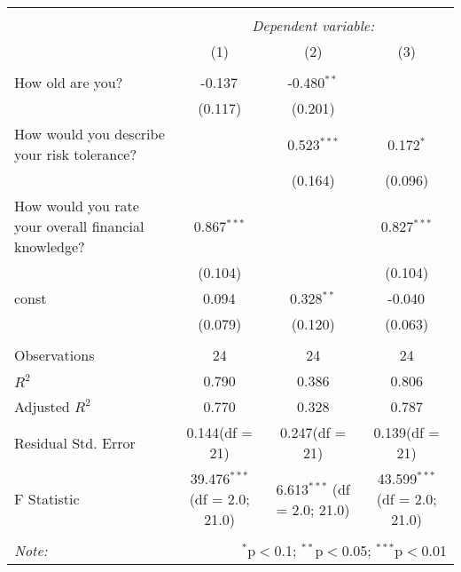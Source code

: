 \documentclass{article}
\begin{document}
    \begin{table}[!htbp] \centering
\begin{tabular}{@{\extracolsep{5pt}}lccc}
\\[-1.8ex]\hline
\hline \\[-1.8ex]
& \multicolumn{3}{c}{\textit{Dependent variable:}} \
\cr \cline{3-4}
\\[-1.8ex] & (1) & (2) & (3) \\
\hline \\[-1.8ex]
 How old are you? & -0.137$^{}$ & -0.480$^{**}$ & \\
  & (0.117) & (0.201) & \\
 How would you describe your risk tolerance? & & 0.523$^{***}$ & 0.172$^{*}$ \\
  & & (0.164) & (0.096) \\
 How would you rate your overall financial knowledge? & 0.867$^{***}$ & & 0.827$^{***}$ \\
  & (0.104) & & (0.104) \\
 const & 0.094$^{}$ & 0.328$^{**}$ & -0.040$^{}$ \\
  & (0.079) & (0.120) & (0.063) \\
\hline \\[-1.8ex]
 Observations & 24 & 24 & 24 \\
 $R^2$ & 0.790 & 0.386 & 0.806 \\
 Adjusted $R^2$ & 0.770 & 0.328 & 0.787 \\
 Residual Std. Error & 0.144(df = 21) & 0.247(df = 21) & 0.139(df = 21)  \\
 F Statistic & 39.476$^{***}$ (df = 2.0; 21.0) & 6.613$^{***}$ (df = 2.0; 21.0) & 43.599$^{***}$ (df = 2.0; 21.0) \\
\hline
\hline \\[-1.8ex]
\textit{Note:} & \multicolumn{3}{r}{$^{*}$p$<$0.1; $^{**}$p$<$0.05; $^{***}$p$<$0.01} \\
\end{tabular}
\end{table}
    
\end{document}
